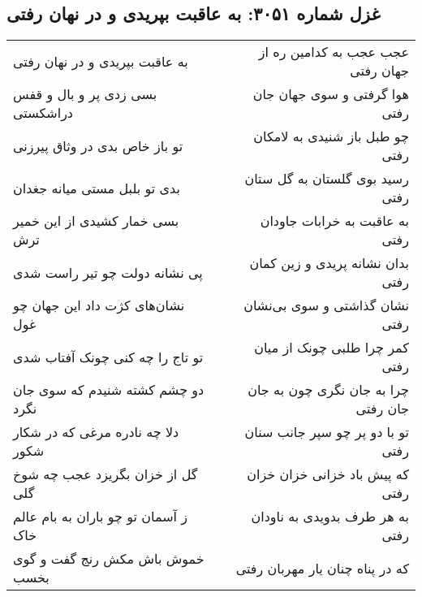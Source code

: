 \begin{center}
\section*{غزل شماره ۳۰۵۱: به عاقبت بپریدی و در نهان رفتی}
\label{sec:3051}
\begin{longtable}{l p{0.5cm} r}
به عاقبت بپریدی و در نهان رفتی
&&
عجب عجب به کدامین ره از جهان رفتی
\\
بسی زدی پر و بال و قفس دراشکستی
&&
هوا گرفتی و سوی جهان جان رفتی
\\
تو باز خاص بدی در وثاق پیرزنی
&&
چو طبل باز شنیدی به لامکان رفتی
\\
بدی تو بلبل مستی میانه جغدان
&&
رسید بوی گلستان به گل ستان رفتی
\\
بسی خمار کشیدی از این خمیر ترش
&&
به عاقبت به خرابات جاودان رفتی
\\
پی نشانه دولت چو تیر راست شدی
&&
بدان نشانه پریدی و زین کمان رفتی
\\
نشان‌های کژت داد این جهان چو غول
&&
نشان گذاشتی و سوی بی‌نشان رفتی
\\
تو تاج را چه کنی چونک آفتاب شدی
&&
کمر چرا طلبی چونک از میان رفتی
\\
دو چشم کشته شنیدم که سوی جان نگرد
&&
چرا به جان نگری چون به جان جان رفتی
\\
دلا چه نادره مرغی که در شکار شکور
&&
تو با دو پر چو سپر جانب سنان رفتی
\\
گل از خزان بگریزد عجب چه شوخ گلی
&&
که پیش باد خزانی خزان خزان رفتی
\\
ز آسمان تو چو باران به بام عالم خاک
&&
به هر طرف بدویدی به ناودان رفتی
\\
خموش باش مکش رنج گفت و گوی بخسب
&&
که در پناه چنان یار مهربان رفتی
\\
\end{longtable}
\end{center}
